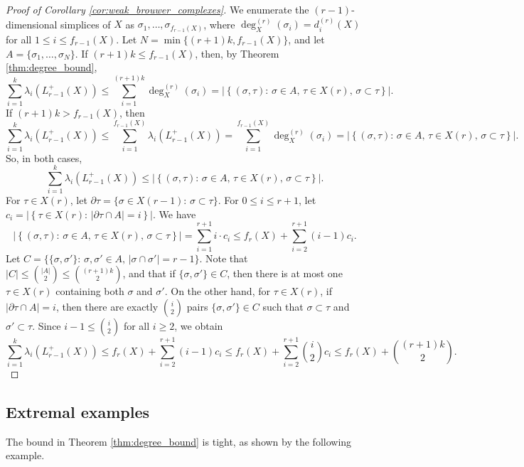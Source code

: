 \documentclass[a4paper,11pt]{article}
\theoremstyle{plain}
\theoremstyle{definition}
\numberwithin{theorem}{section}
\numberwithin{equation}{section}
\begin{document}
\begin{proof}[Proof of Corollary \ref{cor:weak_brouwer_complexes}]

We enumerate the $(r-1)$-dimensional simplices of $X$ as $\sigma_1,\ldots,\sigma_{f_{r-1}(X)}$, where $\deg_X^{(r)}(\sigma_i)=d_i^{(r)}(X)$ for all $1\le i\le f_{r-1}(X)$. Let $N=\min\{(r+1)k,f_{r-1}(X)\}$, and let $A=\{\sigma_1,\ldots,\sigma_{N}\}$.
If $(r+1)k\le f_{r-1}(X)$, then, by Theorem \ref{thm:degree_bound},
\[
    \sum_{i=1}^k \lambda_i(L^+_{r-1}(X)) \le \sum_{i=1}^{(r+1)k} \deg_X^{(r)}(\sigma_i)=\left|\left\{ (\sigma,\tau) : \, \sigma\in A,\, \tau\in X(r),\, \sigma\subset \tau\right\}\right|.
\]
If $(r+1)k>f_{r-1}(X)$, then
\[
 \sum_{i=1}^{k} \lambda_i(L^+_{r-1}(X)) 
 \le  \sum_{i=1}^{f_{r-1}(X)} \lambda_i(L^+_{r-1}(X)) 
 =\sum_{i=1}^{f_{r-1}(X)} \deg_X^{(r)}(\sigma_i)=\left|\left\{ (\sigma,\tau) : \, \sigma\in A,\, \tau\in X(r),\, \sigma\subset \tau\right\}\right|.
\]
So, in both cases,
\[
  \sum_{i=1}^k \lambda_i(L^+_{r-1}(X)) \le \left|\left\{ (\sigma,\tau) : \, \sigma\in A,\, \tau\in X(r),\, \sigma\subset \tau\right\}\right|.
\]
For $\tau\in X(r)$, let $\partial\tau=\{\sigma\in X(r-1):\, \sigma\subset\tau\}$. 
For $0\le i\le r+1$, let $c_i=\left|\left\{\tau\in X(r):\, |\partial\tau\cap A|=i\right\}\right|$. We have
\[
\left|\left\{ (\sigma,\tau) : \, \sigma\in A,\, \tau\in X(r),\, \sigma\subset \tau\right\}\right| = \sum_{i=1}^{r+1} i\cdot c_i \le f_{r}(X) + \sum_{i=2}^{r+1} (i-1)c_i. 
\]
Let $C=\{\{\sigma,\sigma'\}:\, \sigma,\sigma'\in A,\, |\sigma\cap \sigma'|=r-1\}$. Note that $|C|\le \binom{|A|}{2}\le \binom{(r+1)k}{2}$, and that if $\{\sigma,\sigma'\}\in C$, then there is at most one $\tau\in X(r)$ containing both $\sigma$ and $\sigma'$. On the other hand, for $\tau\in X(r)$, if $|\partial \tau\cap A|=i$, then there are exactly $\binom{i}{2}$ pairs $\{\sigma,\sigma'\}\in C$ such that $\sigma\subset\tau$ and $\sigma'\subset\tau$. Since $i-1\le \binom{i}{2}$ for all $i\ge 2$, we obtain
\[
 \sum_{i=1}^k \lambda_i(L^+_{r-1}(X)) \le f_{r}(X) + \sum_{i=2}^{r+1} (i-1)c_i \le f_r(X)+ \sum_{i=2}^{r+1} \binom{i}{2}c_i \le f_r(X)+ \binom{(r+1)k}{2}.
\]
\end{proof}




\subsection{Extremal examples}\label{sec:examples}

The bound in Theorem \ref{thm:degree_bound} is tight, as shown by the following example.
\end{document}
